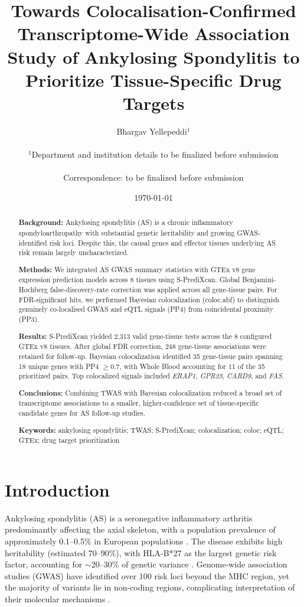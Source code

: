 \documentclass[12pt,a4paper]{article}
\title{Towards Colocalisation-Confirmed Transcriptome-Wide Association Study
       of Ankylosing Spondylitis to Prioritize Tissue-Specific Drug Targets}
\author{
      Bhargav Yellepeddi$^{1}$ \\
  \\
      $^{1}$Department and institution details to be finalized before submission \\
  \\
      Correspondence: to be finalized before submission
}
\date{\today}
\begin{document}
\maketitle

\begin{abstract}
\textbf{Background:}
Ankylosing spondylitis (AS) is a chronic inflammatory spondyloarthropathy
with substantial genetic heritability and growing GWAS-identified risk loci.
Despite this, the causal genes and effector tissues underlying AS risk remain
largely uncharacterized.

\textbf{Methods:}
We integrated AS GWAS summary statistics with GTEx v8 gene expression
prediction models across 8 tissues using S-PrediXcan.
Global Benjamini-Hochberg false-discovery-rate correction was applied across
all gene-tissue pairs. For FDR-significant hits, we performed Bayesian
colocalization (coloc.abf) to distinguish genuinely co-localised GWAS and
eQTL signals (PP4) from coincidental proximity (PP3).

\textbf{Results:}
S-PrediXcan yielded 2,313 valid gene-tissue tests across the 8 configured
GTEx v8 tissues. After global FDR correction, 248 gene-tissue associations
were retained for follow-up. Bayesian colocalization identified 35
gene-tissue pairs spanning 18 unique genes with PP4 $\geq 0.7$, with Whole
Blood accounting for 11 of the 35 prioritized pairs. Top colocalized signals
included \textit{ERAP1}, \textit{GPR25}, \textit{CARD9}, and \textit{FAS}.

\textbf{Conclusions:}
Combining TWAS with Bayesian colocalization reduced a broad set of
transcriptome associations to a smaller, higher-confidence set of
tissue-specific candidate genes for AS follow-up studies.

\textbf{Keywords:}
ankylosing spondylitis; TWAS; S-PrediXcan; colocalization; coloc; eQTL; GTEx; drug target prioritization
\end{abstract}

\newpage

\section{Introduction}

Ankylosing spondylitis (AS) is a seronegative inflammatory arthritis
predominantly affecting the axial skeleton, with a population prevalence of
approximately 0.1--0.5\% in European populations \citep{Reveille2011}.
The disease exhibits high heritability (estimated 70--90\%), with HLA-B*27
as the largest genetic risk factor, accounting for $\sim$20--30\% of
genetic variance \citep{Brown2010}.
Genome-wide association studies (GWAS) have identified over 100 risk loci
beyond the MHC region, yet the majority of variants lie in non-coding regions,
complicating interpretation of their molecular mechanisms \citep{Ellinghaus2016}.
\end{document}
